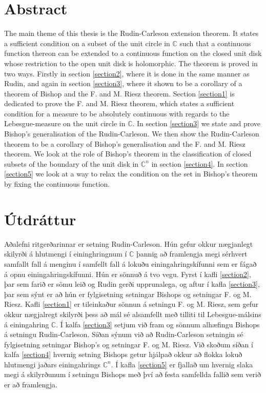 \documentclass[a4paper,12pt,twoside,BCOR=10mm]{scrbook}
\theoremstyle{definition}
\theoremstyle{definition}
\theoremstyle{definition}
\begin{document}
\setcounter{page}{5}
\section*{\huge Abstract}
The main theme of this thesis is the Rudin-Carleson extension theorem.
It states a sufficient condition on a subset of the unit circle in $\mathbb{C}$ such that a continuous function thereon can be extended to a continuous function on the closed unit disk whose restriction to the open unit disk is holomorphic.
The theorem is proved in two ways.
Firstly in section \ref{section2}, where it is done in the same manner as Rudin, and again in section \ref{section3}, where it shown to be a corollary of a theorem of Bishop and the F. and M. Riesz theorem.
Section \ref{section1} is dedicated to prove the F. and M. Riesz theorem, which states a sufficient condition for a measure to be absolutely continuous with regards to the Lebesgue-measure on the unit circle in $\mathbb{C}$.
In section \ref{section3} we state and prove Bishop's generalisation of the Rudin-Carleson.
We then show the Rudin-Carleson theorem to be a corollary of Bishop's generalisation and the F. and M. Riesz theorem.
We look at the role of Bishop's theorem in the classification of closed subsets of the boundary of the unit disk in $\mathbb{C}^n$ in section \ref{section4}.
In section \ref{section5} we look at a way to relax the condition on the set in Bishop's theorem by fixing the continuous function.


\vfill \vspace*{1cm}
\section*{\huge Útdráttur}
Aðalefni ritgerðarinnar er setning Rudin-Carleson.
Hún gefur okkur nægjanlegt skilyrði á hlutmengi í eininghringnum í $\mathbb{C}$ þannig að framlengja megi sérhvert samfallt fall á menginu í samfellt fall á lokuðu einingahringskífunni sem er fágað á opnu einingahringskífunni.
Hún er sönnuð á tvo vegu.
Fyrst í kafli \ref{section2}, þar sem farið er sömu leið og Rudin gerði upprunalega, og aftur í kafla \ref{section3}, þar sem sýnt er að hún er fylgisetning setningar Bishops og setningar F. og M. Riesz.
Kafli \ref{section1} er tileinkaður sönnun á setningu F. og M. Riesz, sem gefur okkur nægjalregt skilyrði þess að mál sé alsamfellt með tilliti til Lebesgue-málsins á einingahring $\mathbb{C}$.
Í kalfa \ref{section3} setjum við fram og sönnum alhæfingu Bishops á setningu Rudin-Carleson.
Síðan sýnum við að Rudin-Carleson setningin sé fylgisetning setningar Bishop's og setningar F. og M. Riesz.
Við skoðum síðan í kalfa \ref{section4} hvernig setning Bishops getur hjálpað okkur að flokka lokuð hlutmengi jaðars einingahrings $\mathbb{C}^n$.
Í kafla \ref{section5} er fjallað um hvernig slaka megi á skilyrðunum í setningu Bishops með því að festa samfellda fallið sem verið er að framlengja.
\vfill
\newpage
\end{document}
